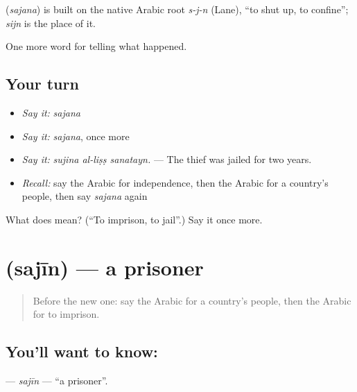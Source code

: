\begin{cousinweb}
\textbf{} (\emph{sajana}) is built on the native Arabic root \emph{s-j-n} (Lane), \textquotedblleft{}to shut up, to confine\textquotedblright{}; \emph{sijn} is the place of it.
\end{cousinweb}

\begin{grammarlens}[title={What you've built}]
One more word for telling what happened.
\end{grammarlens}

\subsection*{Your turn}
\begin{itemize}
\raggedright
  \item \emph{Say it:} \emph{sajana}
  \item \emph{Say it:} \emph{sajana}, once more
  \item \emph{Say it:} \emph{sujina al-liṣṣ sanatayn.} — The thief was jailed for two years.
  \item \emph{Recall:} say the Arabic for independence, then the Arabic for a country’s people, then say \emph{sajana} again
\end{itemize}

\begin{tcolorbox}[breakable,colback=teal!4,colframe=teal!35!black,title={Before you move on}]
What does  mean? (\textquotedblleft{}To imprison, to jail\textquotedblright{}.) Say it once more.
\end{tcolorbox}
\section[\texorpdfstring{\ar{سجين} (sajīn)}{سجين (sajīn)}]{ (sajīn) — a prisoner}

\label{lesson:AR-C330-sajin}



\begin{quote}
Before the new one: say the Arabic for a country’s people, then the Arabic for to imprison.
\end{quote}

\subsection*{You'll want to know: }
\textbf{} — \emph{sajīn} — \textquotedblleft{}a prisoner\textquotedblright{}.


